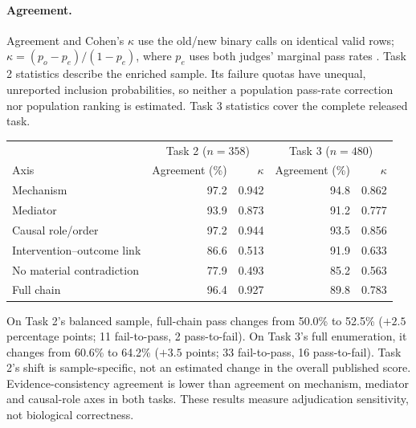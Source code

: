 \paragraph{Agreement.} Agreement and Cohen's $\kappa$ use the old/new binary calls on identical valid rows; $\kappa=(p_o-p_e)/(1-p_e)$, where $p_e$ uses both judges' marginal pass rates \cite{cohen1960agreement}. Task 2 statistics describe the enriched sample. Its failure quotas have unequal, unreported inclusion probabilities, so neither a population pass-rate correction nor population ranking is estimated. Task 3 statistics cover the complete released task.
\begin{center}
\begin{tabular}{lrrrr}
\toprule
 & \multicolumn{2}{c}{Task 2 ($n=358$)} & \multicolumn{2}{c}{Task 3 ($n=480$)} \\
Axis & Agreement (\%) & $\kappa$ & Agreement (\%) & $\kappa$ \\
\midrule
Mechanism & 97.2 & 0.942 & 94.8 & 0.862 \\
Mediator & 93.9 & 0.873 & 91.2 & 0.777 \\
Causal role/order & 97.2 & 0.944 & 93.5 & 0.856 \\
Intervention--outcome link & 86.6 & 0.513 & 91.9 & 0.633 \\
No material contradiction & 77.9 & 0.493 & 85.2 & 0.563 \\
Full chain & 96.4 & 0.927 & 89.8 & 0.783 \\
\bottomrule
\end{tabular}
\end{center}
On Task 2's balanced sample, full-chain pass changes from 50.0\% to 52.5\% ($+2.5$ percentage points; 11 fail-to-pass, 2 pass-to-fail). On Task 3's full enumeration, it changes from 60.6\% to 64.2\% ($+3.5$ points; 33 fail-to-pass, 16 pass-to-fail). Task 2's shift is sample-specific, not an estimated change in the overall published score. Evidence-consistency agreement is lower than agreement on mechanism, mediator and causal-role axes in both tasks. These results measure adjudication sensitivity, not biological correctness.

\clearpage
